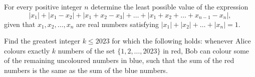 \begin{question}[name={2023 Bulgaria National Olympiad, \href{https://artofproblemsolving.com/community/c6h3049023p27467977}{Problem 5}}]
	For every positive integer $n$ determine the least possible value of the expression
	\[|x_{1}|+|x_{1}-x_{2}|+|x_{1}+x_{2}-x_{3}|+\dots +|x_{1}+x_{2}+\dots +x_{n-1}-x_{n}|,\]given that $x_{1}, x_{2}, \dots , x_{n}$ are real numbers satisfying $|x_{1}|+|x_{2}|+\dots+|x_{n}| = 1$.
\end{question}

%	



\begin{question}[name={2023 British Mathematical Olympiad, Problem 4}]
	Find the greatest integer $k\leq 2023$ for which the following holds: whenever Alice colours exactly $k$ numbers of the set $\{1,2,\dots, 2023\}$ in red, Bob can colour some of the remaining uncoloured numbers in blue, such that the sum of the red numbers is the same as the sum of the blue numbers.
\end{question}

